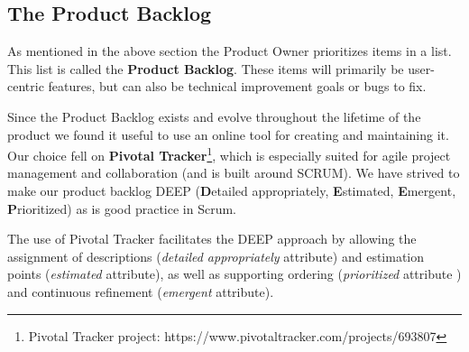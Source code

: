 \subsection{The Product Backlog}

As mentioned in the above section the Product Owner prioritizes items in a list. This list is called the \textbf{Product Backlog}. These items will primarily be user-centric features, but can also be technical improvement goals or bugs to fix.

Since the Product Backlog exists and evolve throughout the lifetime of the product we found it useful to use an online tool for creating and maintaining it. Our choice fell on \textbf{Pivotal Tracker}\footnote{Pivotal Tracker project: https://www.pivotaltracker.com/projects/693807}, which is especially suited for agile project management and collaboration (and is built around SCRUM). We have strived to make our product backlog DEEP (\textbf{D}etailed appropriately, \textbf{E}stimated, \textbf{E}mergent, \textbf{P}rioritized) as is good practice in Scrum.

The use of Pivotal Tracker facilitates the DEEP approach by allowing the assignment of descriptions (\textit{detailed appropriately} attribute) and  estimation points (\textit{estimated} attribute), as well as supporting  ordering (\textit{prioritized} attribute ) and continuous refinement (\textit{emergent} attribute).
